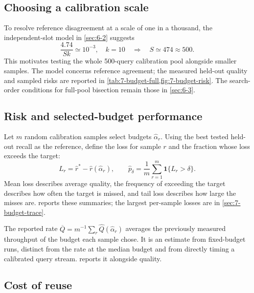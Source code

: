 \subsection{Choosing a calibration scale}

To resolve reference disagreement at a scale of one in a thousand,
the independent-slot model in \cref{sec:6-2} suggests
\[
 \frac{4.74}{Sk}\simeq10^{-3},\quad k=10
 \quad\Longrightarrow\quad S\simeq474\approx500.
\]
This motivates testing the whole 500-query calibration pool alongside
smaller samples. The model concerns reference agreement; the measured
held-out quality and sampled risks are reported in
\cref{tab:7-budget-full,fig:7-budget-risk}. The search-order conditions
for full-pool bisection remain those in \cref{sec:6-3}.

\subsection{Risk and selected-budget performance}

Let $m$ random calibration samples select budgets $\widehat\alpha_r$.
Using the best tested held-out recall as the reference, define the
loss for sample $r$ and the fraction whose loss exceeds the target:
\begin{equation}
 L_r=\widehat r^*-\widehat r(\widehat\alpha_r),\qquad
 \widehat p_\delta=\frac{1}{m}\sum_{r=1}^{m}\mathbf1\{L_r>\delta\}.
 \label{eq:6-risk}
\end{equation}
Mean loss describes average quality, the frequency of exceeding the target describes how
often the target is missed, and tail loss describes how large the misses
are.  reports these summaries;
the largest per-sample losses are in \cref{sec:7-budget-trace}.

The reported rate
$\overline Q=m^{-1}\sum_r\widehat Q(\widehat\alpha_r)$ averages the
previously measured throughput of the budget each sample chose.
It is an estimate from fixed-budget runs, distinct from the rate at the
median budget and from directly timing a calibrated query stream.
 reports it alongside quality.

\subsection{Cost of reuse}

